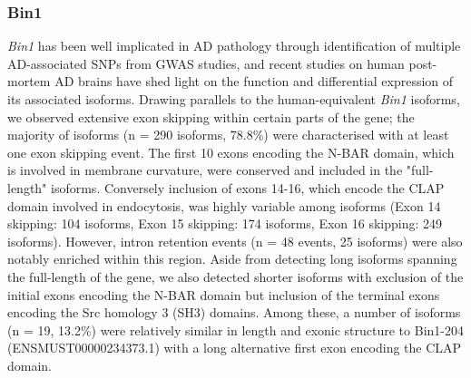 \subsubsection{Bin1}
\textit{Bin1} has been well implicated in AD pathology through identification of multiple AD-associated SNPs from GWAS studies, and recent studies on human post-mortem AD brains have shed light on the function and differential expression of its associated isoforms\cite{Taga2020}. Drawing parallels to the human-equivalent \textit{Bin1} isoforms\cite{Taga2020}, we observed extensive exon skipping within certain parts of the gene; the majority of isoforms (n = 290 isoforms, 78.8\%) were characterised with at least one exon skipping event. The first 10 exons encoding the N-BAR domain, which is involved in membrane curvature, were conserved and included in the "full-length" isoforms. Conversely inclusion of exons 14-16, which encode the CLAP domain involved in endocytosis, was highly variable among isoforms (Exon 14 skipping: 104 isoforms, Exon 15 skipping: 174 isoforms, Exon 16 skipping: 249 isoforms). However, intron retention events (n = 48 events, 25 isoforms) were also notably enriched within this region. Aside from detecting long isoforms spanning the full-length of the gene, we also detected shorter isoforms with exclusion of the initial exons encoding the N-BAR domain but inclusion of the terminal exons encoding the Src homology 3 (SH3) domains. Among these, a number of isoforms (n = 19, 13.2\%) were relatively similar in length and exonic structure to Bin1-204 (ENSMUST00000234373.1) with a long alternative first exon encoding the CLAP domain.  

